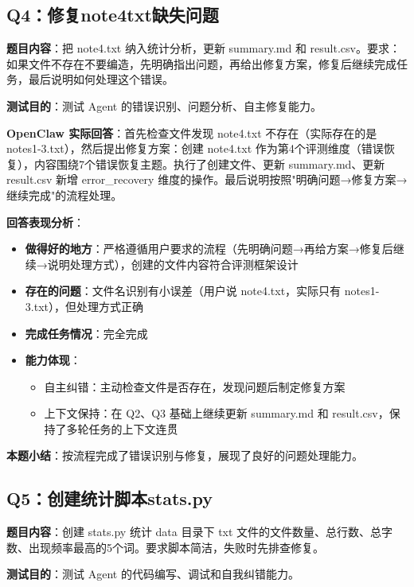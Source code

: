 \documentclass[a4paper]{article}
\begin{document}
\subsection*{Q4：修复note4txt缺失问题}

\textbf{题目内容}：把 note4.txt 纳入统计分析，更新 summary.md 和 result.csv。要求：如果文件不存在不要编造，先明确指出问题，再给出修复方案，修复后继续完成任务，最后说明如何处理这个错误。

\textbf{测试目的}：测试 Agent 的错误识别、问题分析、自主修复能力。

\textbf{OpenClaw 实际回答}：首先检查文件发现 note4.txt 不存在（实际存在的是 notes1-3.txt），然后提出修复方案：创建 note4.txt 作为第4个评测维度（错误恢复），内容围绕7个错误恢复主题。执行了创建文件、更新 summary.md、更新 result.csv 新增 error\_recovery 维度的操作。最后说明按照"明确问题→修复方案→继续完成"的流程处理。

\textbf{回答表现分析}：

\begin{itemize}
    \item \textbf{做得好的地方}：严格遵循用户要求的流程（先明确问题→再给方案→修复后继续→说明处理方式），创建的文件内容符合评测框架设计
    \item \textbf{存在的问题}：文件名识别有小误差（用户说 note4.txt，实际只有 notes1-3.txt），但处理方式正确
    \item \textbf{完成任务情况}：完全完成
    \item \textbf{能力体现}：
    \begin{itemize}
        \item 自主纠错：主动检查文件是否存在，发现问题后制定修复方案
        \item 上下文保持：在 Q2、Q3 基础上继续更新 summary.md 和 result.csv，保持了多轮任务的上下文连贯
    \end{itemize}
\end{itemize}

\textbf{本题小结}：按流程完成了错误识别与修复，展现了良好的问题处理能力。

\subsection*{Q5：创建统计脚本stats.py}

\textbf{题目内容}：创建 stats.py 统计 data 目录下 txt 文件的文件数量、总行数、总字数、出现频率最高的5个词。要求脚本简洁，失败时先排查修复。

\textbf{测试目的}：测试 Agent 的代码编写、调试和自我纠错能力。
\end{document}
